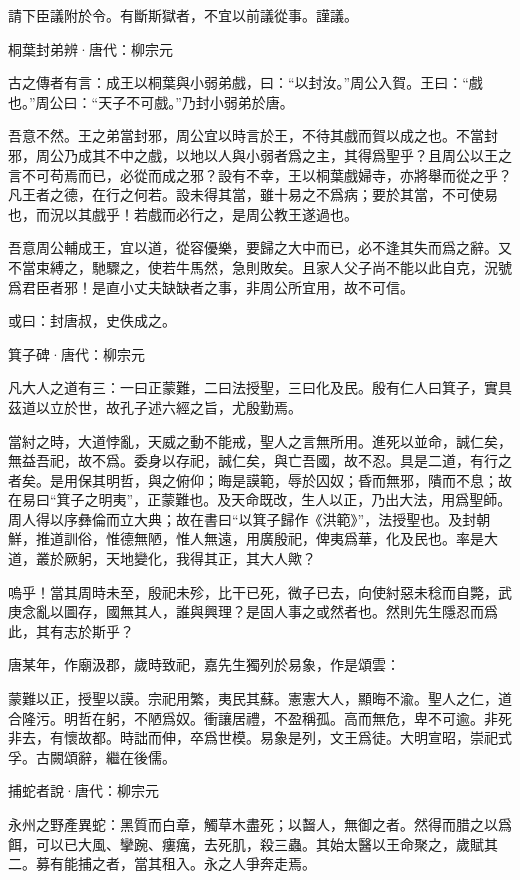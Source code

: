 \documentclass[12pt,a4paper]{ctexbook}
\begin{document}
請下臣議附於令。有斷斯獄者，不宜以前議從事。謹議。\par
桐葉封弟辨·唐代：柳宗元 \par
古之傳者有言：成王以桐葉與小弱弟戲，曰：“以封汝。”周公入賀。王曰：“戲也。”周公曰：“天子不可戲。”乃封小弱弟於唐。\par
吾意不然。王之弟當封邪，周公宜以時言於王，不待其戲而賀以成之也。不當封邪，周公乃成其不中之戲，以地以人與小弱者爲之主，其得爲聖乎？且周公以王之言不可苟焉而已，必從而成之邪？設有不幸，王以桐葉戲婦寺，亦將舉而從之乎？凡王者之德，在行之何若。設未得其當，雖十易之不爲病；要於其當，不可使易也，而況以其戲乎！若戲而必行之，是周公教王遂過也。\par
吾意周公輔成王，宜以道，從容優樂，要歸之大中而已，必不逢其失而爲之辭。又不當束縛之，馳驟之，使若牛馬然，急則敗矣。且家人父子尚不能以此自克，況號爲君臣者邪！是直小丈夫缺缺者之事，非周公所宜用，故不可信。\par
或曰：封唐叔，史佚成之。\par
箕子碑·唐代：柳宗元 \par
凡大人之道有三：一曰正蒙難，二曰法授聖，三曰化及民。殷有仁人曰箕子，實具茲道以立於世，故孔子述六經之旨，尤殷勤焉。\par
當紂之時，大道悖亂，天威之動不能戒，聖人之言無所用。進死以並命，誠仁矣，無益吾祀，故不爲。委身以存祀，誠仁矣，與亡吾國，故不忍。具是二道，有行之者矣。是用保其明哲，與之俯仰；晦是謨範，辱於囚奴；昏而無邪，隤而不息；故在易曰“箕子之明夷”，正蒙難也。及天命既改，生人以正，乃出大法，用爲聖師。周人得以序彝倫而立大典；故在書曰“以箕子歸作《洪範》”，法授聖也。及封朝鮮，推道訓俗，惟德無陋，惟人無遠，用廣殷祀，俾夷爲華，化及民也。率是大道，叢於厥躬，天地變化，我得其正，其大人歟？\par
嗚乎！當其周時未至，殷祀未殄，比干已死，微子已去，向使紂惡未稔而自斃，武庚念亂以圖存，國無其人，誰與興理？是固人事之或然者也。然則先生隱忍而爲此，其有志於斯乎？\par
唐某年，作廟汲郡，歲時致祀，嘉先生獨列於易象，作是頌雲：\par
蒙難以正，授聖以謨。宗祀用繁，夷民其蘇。憲憲大人，顯晦不渝。聖人之仁，道合隆污。明哲在躬，不陋爲奴。衝讓居禮，不盈稱孤。高而無危，卑不可逾。非死非去，有懷故都。時詘而伸，卒爲世模。易象是列，文王爲徒。大明宣昭，崇祀式孚。古闕頌辭，繼在後儒。\par
捕蛇者說·唐代：柳宗元 \par
永州之野產異蛇：黑質而白章，觸草木盡死；以齧人，無御之者。然得而腊之以爲餌，可以已大風、攣踠、瘻癘，去死肌，殺三蟲。其始太醫以王命聚之，歲賦其二。募有能捕之者，當其租入。永之人爭奔走焉。\par
\end{document}
